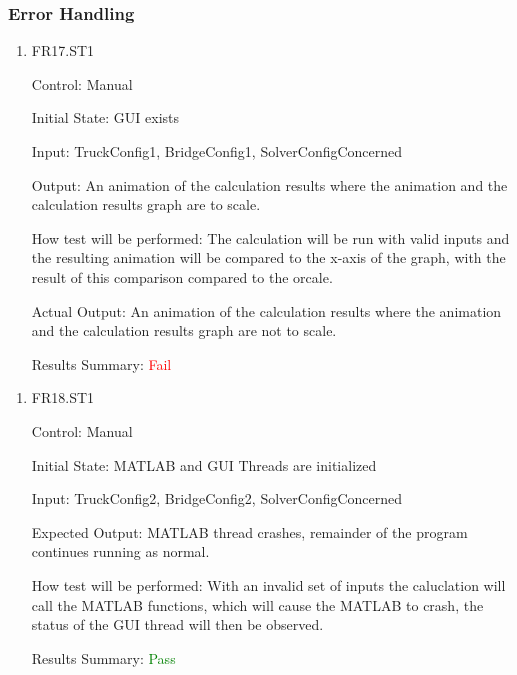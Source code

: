 \documentclass[12pt, titlepage]{article}
\begin{document}
\subsubsection{Error Handling}
\begin{enumerate}

  \item{FR17.ST1\\}
  
  Control: Manual
            
  Initial State: GUI exists
            
  Input: TruckConfig1, BridgeConfig1, SolverConfigConcerned
            
  Output: An animation of the calculation results where the animation and the calculation results graph are to scale.
  
  How test will be performed: The calculation will be run with valid inputs and the resulting animation will be compared to the x-axis of the graph, with the result of this comparison compared to the orcale.

  Actual Output: An animation of the calculation results where the animation and the calculation results graph are not to scale.

  Results Summary: \textcolor{red} {Fail}
   
\end{enumerate}
\begin{enumerate}
  \item{FR18.ST1\\}
  
  Control: Manual
            
  Initial State: MATLAB and GUI Threads are initialized
            
  Input: TruckConfig2, BridgeConfig2, SolverConfigConcerned
            
  Expected Output: MATLAB thread crashes, remainder of the program continues running as normal. 
  
  How test will be performed: With an invalid set of inputs the caluclation will call the MATLAB functions, which will cause the MATLAB to crash, the status of the GUI thread will then be observed.
  
  Results Summary: \textcolor{green} {Pass}
  
\end{enumerate}
\end{document}
